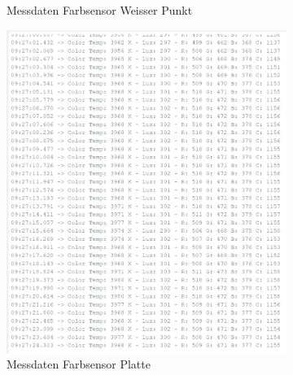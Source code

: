 \begin{figure}[H]
\begin{subfigure}{0.45\textwidth}
        \caption{Messdaten Farbsensor Weisser Punkt}
        \label{fig:MDFarbsensorWeisserPunkt}
    \end{subfigure}
    
    \vspace{0.5cm}

    \begin{subfigure}{0.45\textwidth}
        \centering
        \includegraphics[width=\linewidth]{img/sensortest/MD_RotePlatte.png}
        \caption{Messdaten Farbsensor Platte}
        \label{fig:MDFarbsensorPlatte}
    \end{subfigure}
    \begin{subfigure}{0.45\textwidth}
        \centering

\end{subfigure}
\end{figure}
